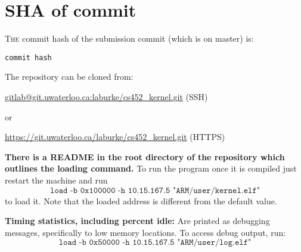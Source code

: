 \documentclass{article}
\begin{document}
\section*{SHA of commit}

\textsc{The} commit hash of the submission commit (which is on master) is:

\texttt{{{{commit hash}}}}

\noindent The repository can be cloned from:

\url{gitlab@git.uwaterloo.ca:laburke/cs452_kernel.git} (SSH)

or

\url{https://git.uwaterloo.ca/laburke/cs452_kernel.git} (HTTPS)

\textbf{There is a README in the root directory of the repository which outlines
the loading command.} To run the program once it is compiled just restart the
machine and run
\[\texttt{load -b 0x100000 -h 10.15.167.5
"ARM/user/kernel.elf"}\]
to load it. Note that the loaded address is different
from the default value.

\textbf{Timing statistics, including percent idle:} Are printed as debugging messages, specifically to low memory locations. To access debug output, run:
\[\texttt{load -b 0x50000 -h 10.15.167.5
"ARM/user/log.elf"}\]
\end{document}
